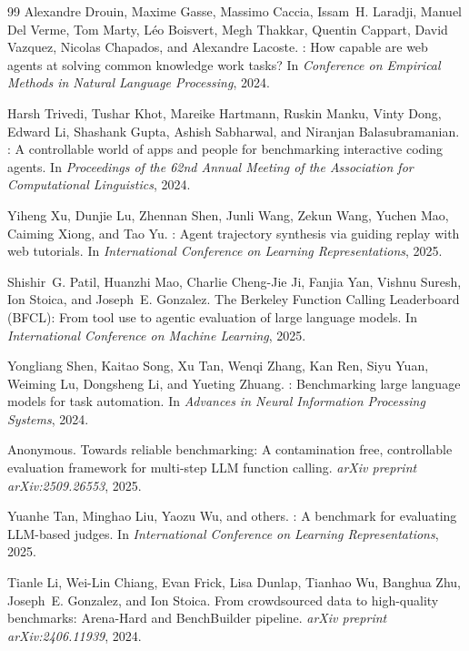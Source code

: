 \begin{thebibliography}{99}
Alexandre Drouin, Maxime Gasse, Massimo Caccia, Issam~H. Laradji, Manuel Del Verme, Tom Marty, L{\'e}o Boisvert, Megh Thakkar, Quentin Cappart, David Vazquez, Nicolas Chapados, and Alexandre Lacoste.
: How capable are web agents at solving common knowledge work tasks?
\newblock In \emph{Conference on Empirical Methods in Natural Language Processing}, 2024.

Harsh Trivedi, Tushar Khot, Mareike Hartmann, Ruskin Manku, Vinty Dong, Edward Li, Shashank Gupta, Ashish Sabharwal, and Niranjan Balasubramanian.
: A controllable world of apps and people for benchmarking interactive coding agents.
\newblock In \emph{Proceedings of the 62nd Annual Meeting of the Association for Computational Linguistics}, 2024.

Yiheng Xu, Dunjie Lu, Zhennan Shen, Junli Wang, Zekun Wang, Yuchen Mao, Caiming Xiong, and Tao Yu.
: Agent trajectory synthesis via guiding replay with web tutorials.
\newblock In \emph{International Conference on Learning Representations}, 2025.

Shishir~G. Patil, Huanzhi Mao, Charlie Cheng-Jie Ji, Fanjia Yan, Vishnu Suresh, Ion Stoica, and Joseph~E. Gonzalez.
\newblock The {Berkeley Function Calling Leaderboard (BFCL)}: From tool use to agentic evaluation of large language models.
\newblock In \emph{International Conference on Machine Learning}, 2025.

Yongliang Shen, Kaitao Song, Xu Tan, Wenqi Zhang, Kan Ren, Siyu Yuan, Weiming Lu, Dongsheng Li, and Yueting Zhuang.
: Benchmarking large language models for task automation.
\newblock In \emph{Advances in Neural Information Processing Systems}, 2024.

Anonymous.
\newblock Towards reliable benchmarking: A contamination free, controllable evaluation framework for multi-step {LLM} function calling.
\newblock \emph{arXiv preprint arXiv:2509.26553}, 2025.

Yuanhe Tan, Minghao Liu, Yaozu Wu, and others.
: A benchmark for evaluating {LLM}-based judges.
\newblock In \emph{International Conference on Learning Representations}, 2025.

Tianle Li, Wei-Lin Chiang, Evan Frick, Lisa Dunlap, Tianhao Wu, Banghua Zhu, Joseph~E. Gonzalez, and Ion Stoica.
\newblock From crowdsourced data to high-quality benchmarks: {Arena-Hard} and {BenchBuilder} pipeline.
\newblock \emph{arXiv preprint arXiv:2406.11939}, 2024.


\end{thebibliography}
